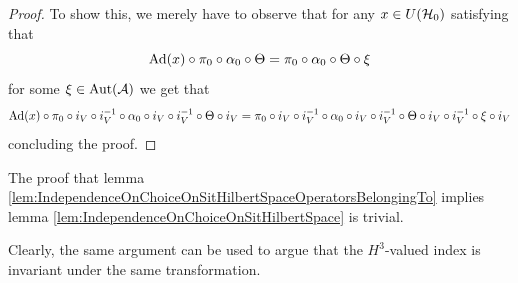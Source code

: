 \documentclass[11pt,a4paper,twoside]{article}
\numberwithin{equation}{section}
\begin{document}
	\begin{proof}
		To show this, we merely have to observe that for any $x\in U(\mathcal H_0)$ satisfying that
		\begin{equation}
			\Ad{x}\circ\pi_0\circ\alpha_0\circ\Theta =\pi_0\circ\alpha_0\circ\Theta\circ\xi
		\end{equation}
		for some $\xi\in\Aut{\AA}$ we get that
		\begin{equation}
			\Ad{x}\circ\pi_0\circ i_V\circ i_V^{-1}\circ\alpha_0\circ i_V\circ i_V^{-1}\circ\Theta\circ i_V =\pi_0\circ i_V\circ i_V^{-1}\circ\alpha_0\circ i_V\circ i_V^{-1}\circ\Theta\circ i_V\circ i_V^{-1}\circ\xi\circ i_V
		\end{equation}
		concluding the proof.
	\end{proof}
	The proof that lemma \ref{lem:IndependenceOnChoiceOnSitHilbertSpaceOperatorsBelongingTo} implies lemma \ref{lem:IndependenceOnChoiceOnSitHilbertSpace} is trivial.
	\begin{remark}\label{rem:OnSiteUnitaryTransformationH3ValuedIndex}
		Clearly, the same argument can be used to argue that the $H^3$-valued index is invariant under the same transformation.
	\end{remark}
\end{document}
